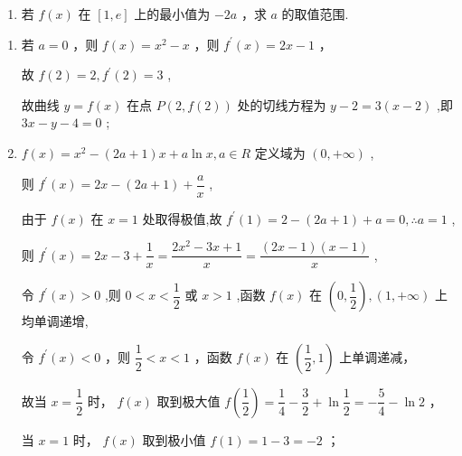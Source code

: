 \begin{enumerate}
\begin{enumerate}
\begin{enumerate}
            \item 若 $f\left( x\right)$ 在 $\left\lbrack  {1,e}\right\rbrack$ 上的最小值为 $- {2a}$ ，求 $a$ 的取值范围.
        \end{enumerate}

        \begin{jieda}
            \begin{enumerate}
                \item 若 $a = 0$ ，则 $f\left( x\right)  = {x}^{2} - x$ ，则 ${f}^{\prime }\left( x\right)  = {2x} - 1$ ，
                
                故 $f\left( 2\right)  = 2,{f}^{\prime }\left( 2\right)  = 3$ ,
                
                故曲线 $y = f\left( x\right)$ 在点 $P\left( {2,f\left( 2\right) }\right)$ 处的切线方程为 $y - 2 = 3\left( {x - 2}\right)$ ,即 ${3x} - y - 4 = 0$ ;
                
                \item  $f\left( x\right)  = {x}^{2} - \left( {{2a} + 1}\right) x + a\ln x,a \in  R$ 定义域为 $\left( {0, + \infty }\right)$ ,
                
                则 ${f}^{\prime }\left( x\right)  = {2x} - \left( {{2a} + 1}\right)  + \dfrac{a}{x}$ ,
                
                由于 $f\left( x\right)$ 在 $x = 1$ 处取得极值,故 ${f}^{\prime }\left( 1\right)  = 2 - \left( {{2a} + 1}\right)  + a = 0,\therefore a = 1$ ,
                
                则 ${f}^{\prime }\left( x\right)  = {2x} - 3 + \dfrac{1}{x} = \dfrac{2{x}^{2} - {3x} + 1}{x} = \dfrac{\left( {{2x} - 1}\right) \left( {x - 1}\right) }{x}$ ,
                
                令 ${f}^{\prime }\left( x\right)  > 0$ ,则 $0 < x < \dfrac{1}{2}$ 或 $x > 1$ ,函数 $f\left( x\right)$ 在 $\left( {0,\dfrac{1}{2}}\right) ,\left( {1, + \infty }\right)$ 上均单调递增,
                
                令 ${f}^{\prime }\left( x\right)  < 0$ ，则 $\dfrac{1}{2} < x < 1$ ，函数 $f\left( x\right)$ 在 $\left( {\dfrac{1}{2},1}\right)$ 上单调递减，
                
                故当 $x = \dfrac{1}{2}$ 时， $f\left( x\right)$ 取到极大值 $f\left( \dfrac{1}{2}\right)  = \dfrac{1}{4} - \dfrac{3}{2} + \ln \dfrac{1}{2} =  - \dfrac{5}{4} - \ln 2$ ，
                
                当 $x = 1$ 时， $f\left( x\right)$ 取到极小值 $f\left( 1\right)  = 1 - 3 =  - 2$ ；
                

\end{enumerate}
\end{jieda}
\end{enumerate}
\end{enumerate}
